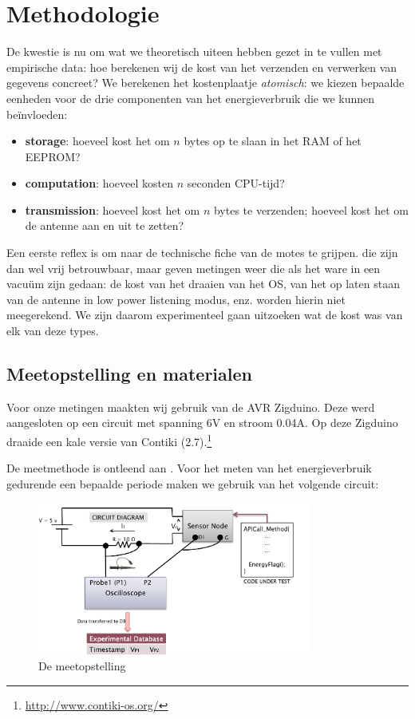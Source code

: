 \documentclass[11pt]{article}
\begin{document}
\section{Methodologie}

De kwestie is nu om wat we theoretisch uiteen hebben gezet in te vullen met
empirische data: hoe berekenen wij de kost van het verzenden en verwerken van
gegevens concreet? We berekenen het kostenplaatje \textit{atomisch}: we kiezen
bepaalde eenheden voor de drie componenten van het energieverbruik die we kunnen
be\"invloeden:

\begin{itemize}
\item \textbf{storage}: hoeveel kost het om $n$ bytes op te slaan in het RAM of
het EEPROM? 
\item \textbf{computation}: hoeveel kosten $n$ seconden CPU-tijd?
\item \textbf{transmission}: hoeveel kost het om $n$ bytes te verzenden; hoeveel
kost het om de antenne aan en uit te zetten?
\end{itemize}

Een eerste reflex is om naar de technische fiche van de motes te grijpen. die
zijn dan wel vrij betrouwbaar, maar geven metingen weer die als het ware in een
vacu\"um zijn gedaan: de kost van het draaien van het OS, van het op laten staan
van de antenne in low power listening modus, enz. worden hierin niet
meegerekend. We zijn daarom experimenteel gaan uitzoeken wat de kost was van elk
van deze types.

\subsection{Meetopstelling en materialen}

Voor onze metingen maakten wij gebruik van de AVR Zigduino. Deze werd
aangesloten op een circuit met spanning 6V en stroom 0.04A.
Op deze Zigduino draaide een kale versie van Contiki (2.7).\footnote{\url{http://www.contiki-os.org/}}

De meetmethode is ontleend aan \cite{hughes2013energy}. Voor het meten van het
energieverbruik gedurende een bepaalde periode maken we gebruik van het volgende
circuit:

\begin{figure}[h]
\centering
\includegraphics[width=9cm]{meetopstelling}
\caption{De meetopstelling }
\label{fig:meetopstelling}
\end{figure}
\end{document}

